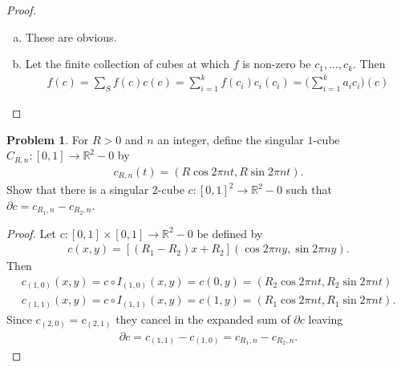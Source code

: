 \documentclass[20pt]{article}
\theoremstyle{plain}
\theoremstyle{definition}
\newtheorem*{problem}{Problem}
\newcommand{\reals}{\mathbb{R}}
\begin{document}
\begin{proof}
  \begin{enumerate}[(a)]
    \item 
      These are obvious.
    \item 
      Let the finite collection of cubes at which $f$ is non-zero be 
      $c_1, ..., c_k$.  Then 
      \begin{align*}
        f(c) = \sum_S f(c)c(c) = \sum_{i=1}^kf(c_i)c_i(c_i) = \bigg(\sum_{i=1}^ka_i c_i\bigg)(c)
      \end{align*}
  \end{enumerate}
\end{proof}









\begin{problem}{4.23}
  For $R > 0$ and $n$ an integer, define the singular $1$-cube 
  $C_{R, n} : [0, 1] \to \reals^2 - 0$ by
  \begin{align*}
    c_{R, n}(t) = (R \cos 2 \pi n t, R \sin 2 \pi n t).
  \end{align*}
  Show that there is a singular $2$-cube $c: [0,1]^2 \to \reals^2- 0$
   such that $\partial c = c_{R_1, n} - c_{R_2, n}$.
\end{problem}

\begin{proof}
  Let $c: [0, 1] \times [0,1] \to \reals^2 - 0$ be defined by 
  \begin{align*}
    c(x, y) = [(R_1 - R_2)x + R_2](\cos2 \pi n y ,\sin2 \pi n y).
  \end{align*}
  Then 
  \begin{align*}
    c_{(1, 0)}(x, y) = 
    c \circ I_{(1, 0)}(x, y) = 
    c(0, y) = 
    (R_2 \cos 2 \pi n t, R_2 \sin 2 \pi n t) \\
    c_{(1, 1)}(x, y) = 
    c \circ I_{(1, 1)}(x, y) = 
    c(1, y) = 
    (R_1 \cos 2 \pi n t, R_1 \sin 2 \pi n t).
  \end{align*}
  Since $c_{(2, 0)} = c_{(2, 1)}$ they cancel in the expanded sum of $\partial c$ leaving
  \begin{align*}
    \partial c = c_{(1, 1)} - c_{(1, 0)} = c_{R_1, n} - c_{R_2, n}.
  \end{align*}
\end{proof}
\end{document}
